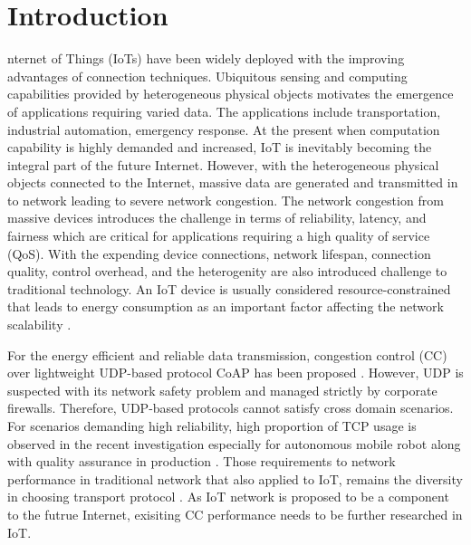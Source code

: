 \documentclass[journal]{IEEEtran}
\begin{document}
\section{Introduction}
nternet of Things (IoTs) have been widely deployed with the improving advantages of connection techniques. Ubiquitous sensing and computing capabilities provided by heterogeneous physical objects motivates the emergence of applications requiring varied data. The applications include transportation, industrial automation, emergency response. At the present when computation capability is highly demanded and increased, IoT is inevitably becoming the integral part of the future Internet. However, with the heterogeneous physical objects connected to the Internet, massive data are generated and transmitted in to network leading to severe network congestion. The network congestion from massive devices introduces the challenge in terms of reliability, latency, and fairness which are critical for applications requiring a high quality of service (QoS). With the expending device connections, 
network lifespan, connection quality, control overhead, and the heterogenity are also introduced challenge to traditional technology. An IoT device is usually considered resource-constrained that leads to energy consumption as an important factor affecting the network scalability \cite{jain2022congestion, anitha2024comprehensive, nguyen20216g}.

For the energy efficient and reliable data transmission, congestion control (CC) over lightweight UDP-based protocol CoAP has been proposed \cite{betzler2016coap}.
However, UDP is suspected with its network safety problem and managed strictly by corporate firewalls. 
Therefore, UDP-based protocols cannot satisfy cross domain scenarios. For scenarios demanding high reliability, high proportion of TCP usage is observed in the recent investigation especially for autonomous mobile robot along with quality assurance in production \cite{mogensen2021empirical, raunholt2021towards}. Those requirements to network performance in traditional network that also applied to IoT, remains the diversity in choosing transport protocol \cite{gomez2018tcp,kumar2020performant,mhamdi2023congestion}. 
As IoT network is proposed to be a component to the futrue Internet, exisiting CC performance needs to be further researched in IoT.
\end{document}
